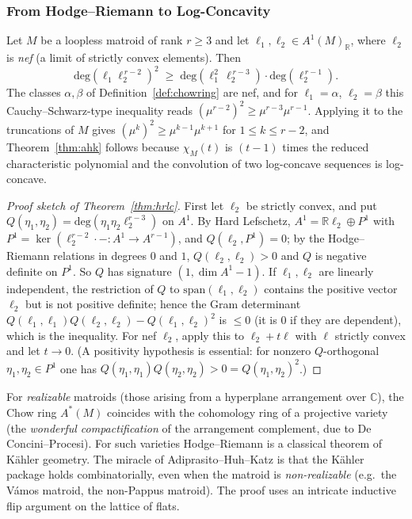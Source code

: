 \subsubsection{From Hodge--Riemann to Log-Concavity}

\begin{theorem}\label{thm:hrlc}
Let $M$ be a loopless matroid of rank $r \ge 3$ and let
$\ell_1, \ell_2 \in A^1(M)_{\mathbb R}$, where $\ell_2$ is \emph{nef}
(a limit of strictly convex elements). Then
\[
  \mathrm{deg}(\ell_1 \ell_2^{\,r - 2})^2
  \;\ge\; \mathrm{deg}(\ell_1^2\, \ell_2^{\,r - 3}) \cdot \mathrm{deg}(\ell_2^{\,r - 1}).
\]
The classes $\alpha, \beta$ of Definition~\ref{def:chowring} are nef,
and for $\ell_1 = \alpha$, $\ell_2 = \beta$ this Cauchy--Schwarz-type
inequality reads $(\mu^{r-2})^2 \ge \mu^{r-3} \mu^{r-1}$. Applying it to
the truncations of $M$ gives $(\mu^k)^2 \ge \mu^{k-1} \mu^{k+1}$ for
$1 \le k \le r - 2$, and Theorem~\ref{thm:ahk} follows because
$\chi_M(t)$ is $(t - 1)$ times the reduced characteristic polynomial
and the convolution of two log-concave sequences is log-concave.
\end{theorem}

\begin{proof}[Proof sketch of Theorem~\ref{thm:hrlc}]
First let $\ell_2$ be strictly convex, and put
$Q(\eta_1, \eta_2) = \mathrm{deg}(\eta_1 \eta_2 \ell_2^{r - 3})$ on $A^1$.
By Hard Lefschetz, $A^1 = \mathbb R \ell_2 \oplus P^1$ with
$P^1 = \ker(\ell_2^{r-2} \cdot - : A^1 \to A^{r-1})$, and
$Q(\ell_2, P^1) = 0$; by the Hodge--Riemann relations in degrees $0$
and $1$, $Q(\ell_2, \ell_2) > 0$ and $Q$ is negative definite on $P^1$.
So $Q$ has signature $(1, \dim A^1 - 1)$. If $\ell_1, \ell_2$ are
linearly independent, the restriction of $Q$ to
$\mathrm{span}(\ell_1, \ell_2)$ contains the positive vector $\ell_2$
but is not positive definite; hence the Gram determinant
$Q(\ell_1, \ell_1) Q(\ell_2, \ell_2) - Q(\ell_1, \ell_2)^2$ is $\le 0$
(it is $0$ if they are dependent), which is the inequality. For nef
$\ell_2$, apply this to $\ell_2 + t\ell$ with $\ell$ strictly convex and
let $t \to 0$. (A positivity hypothesis is essential: for nonzero
$Q$-orthogonal $\eta_1, \eta_2 \in P^1$ one has
$Q(\eta_1, \eta_1) Q(\eta_2, \eta_2) > 0 = Q(\eta_1, \eta_2)^2$.)
\end{proof}

\begin{remark}
For \emph{realizable} matroids (those arising from a hyperplane
arrangement over $\mathbb C$), the Chow ring $A^*(M)$ coincides with
the cohomology ring of a projective variety (the \emph{wonderful
compactification} of the arrangement complement, due to De
Concini--Procesi). For such varieties Hodge--Riemann is a classical
theorem of K\"ahler geometry.
The miracle of Adiprasito--Huh--Katz is that the K\"ahler package
holds combinatorially, even when the matroid is \emph{non-realizable}
(e.g.\ the V\'amos matroid, the non-Pappus matroid). The proof uses
an intricate inductive flip argument on the lattice of flats.
\end{remark}

